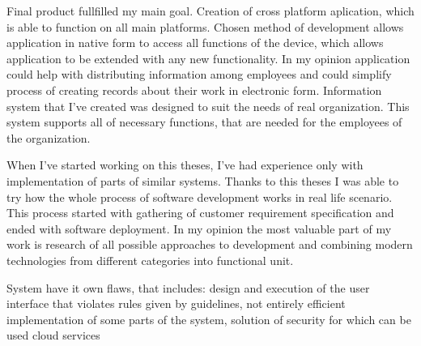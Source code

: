 \documentclass[
  glossaries,
]{kidiplom}
\begin{document}
\begin{kiconclusions}[english]
Final product fullfilled my main goal. Creation of cross platform aplication, which is able to function on all main platforms. Chosen method of development allows application in native form to access all functions of the device, which allows application to be extended with any new functionality. In my opinion application could help with distributing information among employees and could simplify process of creating records about their work in electronic form. Information system that I've created was designed to suit the needs of real organization. This system supports all of necessary functions, that are needed for the employees of the organization.


When I've started working on this theses, I've had experience only with implementation of parts of similar systems. Thanks to this theses I was able to try how the whole process of software development works in real life scenario. This process started with gathering of customer requirement specification and ended with software deployment. In my opinion the most valuable part of my work is research of all possible approaches to development and combining modern technologies from different categories into functional unit.


System have it own flaws, that includes: design and execution of the user interface that violates rules given by guidelines, not entirely efficient implementation of some parts of the system, solution of security for which can be used cloud services
\end{kiconclusions}

\appendix
\end{document}
